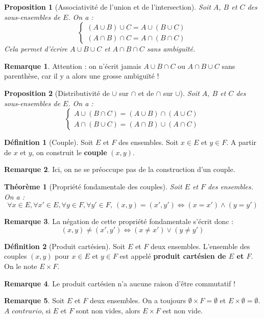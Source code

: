 \documentclass[french]{book}
\theoremstyle{plain}
\newtheorem{thm}{Théorème}[chapter]
\newtheorem{prop}{Proposition}[chapter]
\theoremstyle{definition}
\newtheorem{dfn}{Définition}[chapter]
\newtheorem{rmq}{Remarque}[chapter]
\theoremstyle{remark}
\begin{document}
\begin{prop}[Associativité de l'union et de l'intersection]
	Soit $A$, $B$ et $C$ des sous-ensembles de $E$. On a : $$\begin{cases}
		(A\cup B)\cup C=A\cup(B\cup C) \\ (A\cap B)\cap C=A\cap(B\cap C)
	\end{cases}$$ Cela permet d'écrire $A\cup B\cup C$ et $A\cap B\cap C$ sans ambiguïté.
\end{prop}
\begin{rmq}
	Attention : on n'écrit jamais $A\cup B\cap C$ ou $A\cap B\cup C$ sans parenthèse, car il y a alors une grosse ambiguïté !
\end{rmq}
\begin{prop}[Distributivité de $\cup$ sur $\cap$ et de $\cap$ sur $\cup$]
	Soit $A$, $B$ et $C$ des sous-ensembles de $E$. On a : $$\begin{cases}
		A\cup(B\cap C)=(A\cup B)\cap (A\cup C)\\ A\cap(B\cup C)=(A\cap B)\cup(A\cap C)
	\end{cases}$$
\end{prop}
\begin{dfn}[Couple]
	Soit $E$ et $F$ des ensembles. Soit $x\in E$ et $y\in F$. A partir de $x$ et $y$, on construit le \textbf{couple} $(x,y)$.
\end{dfn}
\begin{rmq}
	Ici, on ne se préoccupe pas de la construction d'un couple.
\end{rmq}
\begin{thm}[Propriété fondamentale des couples]
	Soit $E$ et $F$ des ensembles. On a : $$\forall x\in E,\forall x'\in E,\forall y\in F,\forall y'\in F,\ (x,y)=(x',y')\iff(x=x')\land(y=y')$$
\end{thm}
\begin{rmq}
	La négation de cette propriété fondamentale s'écrit donc : $$(x,y)\ne(x',y')\iff(x\ne x')\lor(y\ne y')$$
\end{rmq}
\begin{dfn}[Produit cartésien]
	Soit $E$ et $F$ deux ensembles. L'ensemble des couples $(x,y)$ pour $x\in E$ et $y\in F$ est appelé \textbf{produit cartésien de $E$ et $F$}. On le note $E\times F$.
\end{dfn}
\begin{rmq}
	Le produit cartésien n'a aucune raison d'être commutatif !
\end{rmq}
\begin{rmq}
	Soit $E$ et $F$ deux ensembles. On a toujours $\emptyset\times F=\emptyset$ et $E\times\emptyset=\emptyset$. $A$ $contrario$, si $E$ et $F$ sont non vides, alors $E\times F$ est non vide.
\end{rmq}
\end{document}
